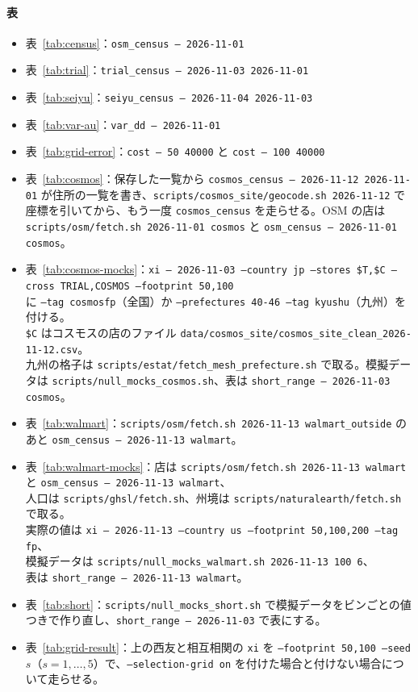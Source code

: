 \documentclass[a4paper,11pt]{ltjsarticle}
\newcommand{\code}[1]{\textcolor{codecolor}{\texttt{#1}}}
\begin{document}
\paragraph{表}
\begin{itemize}
  \item 表~\ref{tab:census}：\code{osm\_census -- 2026-11-01}
  \item 表~\ref{tab:trial}：\code{trial\_census -- 2026-11-03 2026-11-01}
  \item 表~\ref{tab:seiyu}：\code{seiyu\_census -- 2026-11-04 2026-11-03}
  \item 表~\ref{tab:var-au}：\code{var\_dd -- 2026-11-01}
  \item 表~\ref{tab:grid-error}：\code{cost -- 50 40000} と \code{cost -- 100 40000}
  \item 表~\ref{tab:cosmos}：保存した一覧から \code{cosmos\_census -- 2026-11-12 2026-11-01} が住所の一覧を書き、\code{scripts/cosmos\_site/geocode.sh 2026-11-12} で座標を引いてから、もう一度 \code{cosmos\_census} を走らせる。OSM の店は \code{scripts/osm/fetch.sh 2026-11-01 cosmos} と \code{osm\_census -- 2026-11-01 cosmos}。
  \item 表~\ref{tab:cosmos-mocks}：\code{xi -- 2026-11-03 --country jp --stores \$T,\$C --cross TRIAL,COSMOS --footprint 50,100}\\
    に \code{--tag cosmosfp}（全国）か \code{--prefectures 40-46 --tag kyushu}（九州）を付ける。\\
    \code{\$C} はコスモスの店のファイル \code{data/cosmos\_site/cosmos\_site\_clean\_2026-11-12.csv}。\\
    九州の格子は \code{scripts/estat/fetch\_mesh\_prefecture.sh} で取る。模擬データは \code{scripts/null\_mocks\_cosmos.sh}、表は \code{short\_range -- 2026-11-03 cosmos}。
  \item 表~\ref{tab:walmart}：\code{scripts/osm/fetch.sh 2026-11-13 walmart\_outside} のあと \code{osm\_census -- 2026-11-13 walmart}。
  \item 表~\ref{tab:walmart-mocks}：店は \code{scripts/osm/fetch.sh 2026-11-13 walmart} と \code{osm\_census -- 2026-11-13 walmart}、\\
    人口は \code{scripts/ghsl/fetch.sh}、州境は \code{scripts/naturalearth/fetch.sh} で取る。\\
    実際の値は \code{xi -- 2026-11-13 --country us --footprint 50,100,200 --tag fp}、\\
    模擬データは \code{scripts/null\_mocks\_walmart.sh 2026-11-13 100 6}、\\
    表は \code{short\_range -- 2026-11-13 walmart}。
  \item 表~\ref{tab:short}：\code{scripts/null\_mocks\_short.sh} で模擬データをビンごとの値つきで作り直し、\code{short\_range -- 2026-11-03} で表にする。
  \item 表~\ref{tab:grid-result}：上の西友と相互相関の \code{xi} を \code{--footprint 50,100 --seed} $s$（$s = 1, \dots, 5$）で、\code{--selection-grid on} を付けた場合と付けない場合について走らせる。
\end{itemize}
\end{document}

